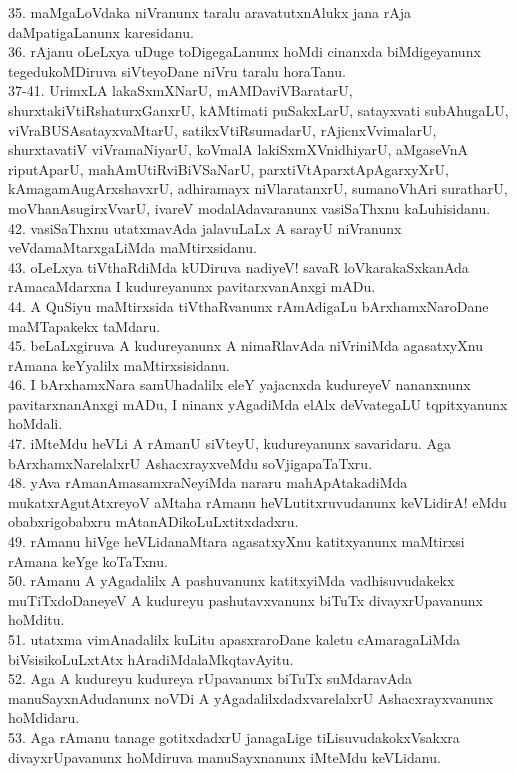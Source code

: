 \documentclass{article}
\begin{document}
35. maMgaLoVdaka niVranunx taralu aravatutxnAlukx jana rAja daMpatigaLanunx karesidanu.\\
36. rAjanu oLeLxya uDuge toDigegaLanunx hoMdi cinanxda biMdigeyanunx tegedukoMDiruva siVteyoDane niVru taralu horaTanu.\\
37-41. UrimxLA lakaSxmXNarU, mAMDaviVBaratarU, shurxtakiVtiRshaturxGanxrU, kAMtimati puSakxLarU, satayxvati subAhugaLU, viVraBUSAsatayxvaMtarU, satikxVtiRsumadarU, rAjicnxVvimalarU, shurxtavatiV viVramaNiyarU, koVmalA lakiSxmXVnidhiyarU, aMgaseVnA riputAparU, mahAmUtiRviBiVSaNarU, parxtiVtAparxtApAgarxyXrU, kAmagamAugArxshavxrU, adhiramayx niVlaratanxrU, sumanoVhAri suratharU, moVhanAsugirxVvarU, ivareV modalAdavaranunx vasiSaThxnu kaLuhisidanu.\\
42. vasiSaThxnu utatxmavAda jalavuLaLx A sarayU niVranunx veVdamaMtarxgaLiMda maMtirxsidanu.\\
43. oLeLxya tiVthaRdiMda kUDiruva nadiyeV! savaR loVkarakaSxkanAda rAmacaMdarxna I kudureyanunx pavitarxvanAnxgi mADu.\\
44. A QuSiyu maMtirxsida tiVthaRvanunx rAmAdigaLu bArxhamxNaroDane maMTapakekx taMdaru.\\
45. beLaLxgiruva A kudureyanunx A nimaRlavAda niVriniMda agasatxyXnu rAmana keYyalilx maMtirxsisidanu.\\
46. I bArxhamxNara samUhadalilx eleY yajacnxda kudureyeV nananxnunx pavitarxnanAnxgi mADu, I ninanx yAgadiMda elAlx deVvategaLU tqpitxyanunx hoMdali.\\
47. iMteMdu heVLi A rAmanU siVteyU, kudureyanunx savaridaru. Aga bArxhamxNarelalxrU AshacxrayxveMdu soVjigapaTaTxru.\\
48. yAva rAmanAmasamxraNeyiMda nararu mahApAtakadiMda mukatxrAgutAtxreyoV aMtaha rAmanu heVLutitxruvudanunx keVLidirA! eMdu obabxrigobabxru mAtanADikoLuLxtitxdadxru.\\
49. rAmanu hiVge heVLidanaMtara agasatxyXnu katitxyanunx maMtirxsi rAmana keYge koTaTxnu.\\
50. rAmanu A yAgadalilx A pashuvanunx katitxyiMda vadhisuvudakekx muTiTxdoDaneyeV A kudureyu pashutavxvanunx biTuTx divayxrUpavanunx hoMditu.\\
51. utatxma vimAnadalilx kuLitu apasxraroDane kaletu cAmaragaLiMda biVsisikoLuLxtAtx hAradiMdalaMkqtavAyitu.\\
52. Aga A kudureyu kudureya rUpavanunx biTuTx suMdaravAda manuSayxnAdudanunx noVDi A yAgadalilxdadxvarelalxrU Ashacxrayxvanunx hoMdidaru.\\
53. Aga rAmanu tanage gotitxdadxrU janagaLige tiLisuvudakokxVsakxra divayxrUpavanunx hoMdiruva manuSayxnanunx iMteMdu keVLidanu.\\
\end{document}
